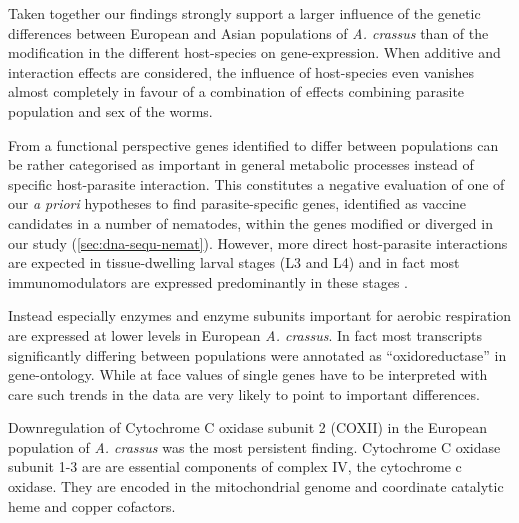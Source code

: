 Taken together our findings strongly support a larger influence of the
genetic differences between European and Asian populations of
\textit{A. crassus} than of the modification in the different
host-species on gene-expression. When additive and interaction effects
are considered, the influence of host-species even vanishes almost
completely in favour of a combination of effects combining parasite
population and sex of the worms.

From a functional perspective genes identified to differ between
populations can be rather categorised as important in general
metabolic processes instead of specific host-parasite interaction.
This constitutes a negative evaluation of one of our \textit{a
  priori} hypotheses to find parasite-specific genes, identified as
vaccine candidates in a number of nematodes, within the genes modified
or diverged in our study (\ref{sec:dna-sequ-nemat}). However, more
direct host-parasite interactions are expected in tissue-dwelling
larval stages (L3 and L4) and in fact most immunomodulators are
expressed predominantly in these stages \cite{maizels_helminth_2004}. 



Instead especially enzymes and enzyme subunits important for aerobic
respiration are expressed at lower levels in European
\textit{A. crassus}. In fact most transcripts significantly differing
between populations were annotated as ``oxidoreductase'' in
gene-ontology. While at face values of single genes have to be
interpreted with care such trends in the data are very likely to point
to important differences.

Downregulation of Cytochrome C oxidase subunit 2 (COXII) in the
European population of \textit{A. crassus} was the most persistent
finding. Cytochrome C oxidase subunit 1-3 are are essential components
of complex IV, the cytochrome c oxidase. They are encoded in the
mitochondrial genome and coordinate catalytic heme and copper
cofactors.

